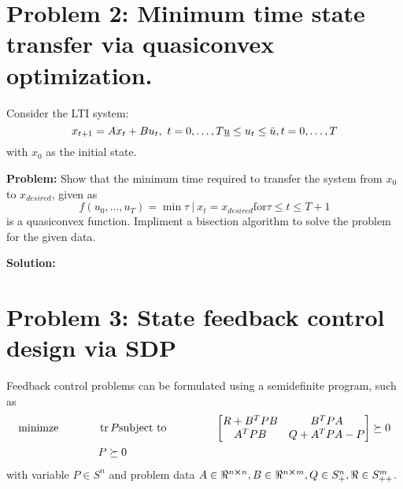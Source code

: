 \documentclass[letter]{article}
\begin{document}
\newpage
\section{Problem 2: Minimum time state transfer via quasiconvex optimization.}
Consider the LTI system:
\begin{equation}\label{eq:quasiconvex_opt_def}
	x_{t+1} = Ax_t + B u_t, \ t = 0,\dots,T\\
	\underline{u} \leq u_t \leq \bar{u}, t = 0,\dots,T
\end{equation}
with $x_0$ as the initial state.

\textbf{Problem:}
Show that the minimum time required to transfer the system from $x_0$ to $x_{desired}$, given as
\begin{equation}\label{eq:qualiconvex_problem_result}
	f(u_0,\dots,u_T) = \min{\tau \ | \ x_t = x_{desired} \text{for} \tau \leq t \leq {T+1}}
\end{equation}
is a quasiconvex function. Impliment a bisection algorithm to solve the problem for the given data.

\textbf{Solution:}








\newpage
\section{Problem 3: State feedback control design via SDP}
Feedback control problems can be formulated using a semidefinite program, such as
\begin{equation}\label{eq:feedback_control_def}
	\begin{aligned}
		\text{minimze} \hspace{0.5in}& \trace{P}
		\text{subject to} \hspace{0.5in}
		& \mqty [R + B^T PB & B^T PA\\
				 A^T PB & Q + A^T P A - P] \succeq 0\\
				 & P \succeq 0
	\end{aligned}
\end{equation}
with variable $P \in S^n$ and problem data $A\in \real^{n\cross n}, B \in\real^{n\cross m}, Q \in S^n_+, \real \in S^m_{++}$.\\
\end{document}
